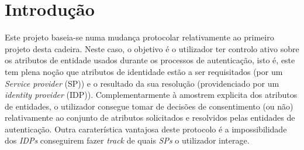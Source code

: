 \section{Introdução}


\quad Este projeto baseia-se numa mudança protocolar relativamente ao primeiro projeto desta cadeira. Neste caso, o objetivo é o utilizador ter controlo ativo sobre os atributos de entidade usados durante os processos de autenticação, isto é, este tem plena noção que atributos de identidade estão a ser requisitados (por um  \textit{Service provider} (SP)) e o resultado da sua resolução (providenciado por um \textit{identity provider} (IDP)). Complementarmente à amostrem explicita dos atributos de entidades, o utilizador consegue tomar de decisões de consentimento (ou não) relativamente ao conjunto de atributos solicitados e resolvidos pelas entidades de autenticação. Outra caraterística vantajosa deste protocolo é a impossibilidade dos \textit{IDPs} conseguirem fazer \textit{track} de quais \textit{SPs} o utilizador interage.


